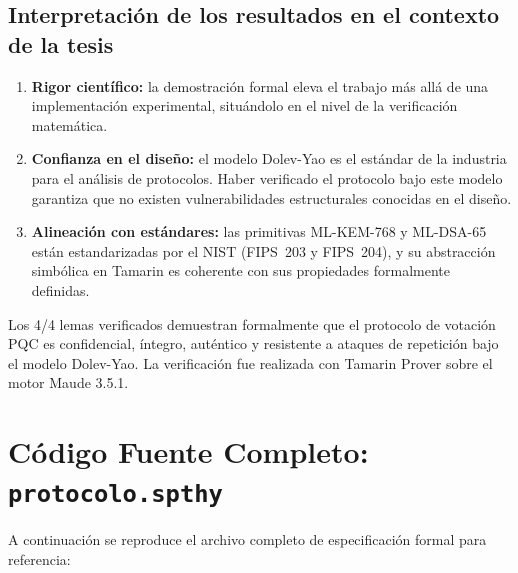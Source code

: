 \documentclass[12pt, a4paper, twoside, openright]{book}
\begin{document}
\section{Interpretaci\'on de los resultados en el contexto de la tesis}

\begin{enumerate}[leftmargin=*, itemsep=8pt]
  \item \textbf{Rigor cient\'ifico:} la demostraci\'on formal eleva el
    trabajo m\'as all\'a de una implementaci\'on experimental, situ\'andolo
    en el nivel de la verificaci\'on matem\'atica.
  \item \textbf{Confianza en el dise\~no:} el modelo Dolev-Yao es el
    est\'andar de la industria para el an\'alisis de protocolos. Haber
    verificado el protocolo bajo este modelo garantiza que no existen
    vulnerabilidades estructurales conocidas en el dise\~no.
  \item \textbf{Alineaci\'on con est\'andares:} las primitivas ML-KEM-768
    y ML-DSA-65 est\'an estandarizadas por el NIST (FIPS~203 y FIPS~204),
    y su abstracci\'on simb\'olica en Tamarin es coherente con sus
    propiedades formalmente definidas.
\end{enumerate}

\begin{cajaResumen}
  Los 4/4 lemas verificados demuestran formalmente que el protocolo de
  votaci\'on PQC es confidencial, \'integro, aut\'entico y resistente a
  ataques de repetici\'on bajo el modelo Dolev-Yao. La verificaci\'on fue
  realizada con Tamarin Prover sobre el motor Maude 3.5.1.
\end{cajaResumen}

\appendix

\chapter{C\'odigo Fuente Completo: \texttt{protocolo.spthy}}

A continuaci\'on se reproduce el archivo completo de especificaci\'on
formal para referencia:
\end{document}
